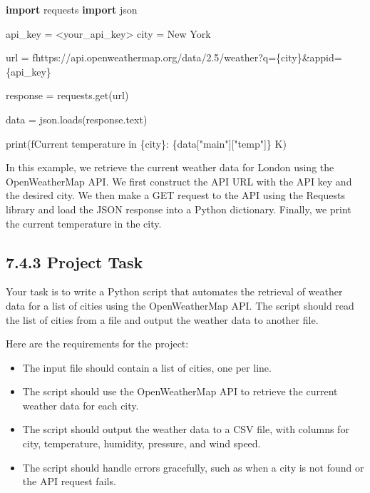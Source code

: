 \documentclass[
  paper=a4,
  ,captions=tableheading
]{scrartcl}
\newenvironment{Shaded}{}{}
\newcommand{\BuiltInTok}[1]{\textcolor[rgb]{0.00,0.50,0.00}{#1}}
\newcommand{\ImportTok}[1]{\textcolor[rgb]{0.00,0.50,0.00}{\textbf{#1}}}
\newcommand{\NormalTok}[1]{#1}
\newcommand{\OperatorTok}[1]{\textcolor[rgb]{0.40,0.40,0.40}{#1}}
\newcommand{\SpecialCharTok}[1]{\textcolor[rgb]{0.25,0.44,0.63}{#1}}
\newcommand{\SpecialStringTok}[1]{\textcolor[rgb]{0.73,0.40,0.53}{#1}}
\newcommand{\StringTok}[1]{\textcolor[rgb]{0.25,0.44,0.63}{#1}}
\providecommand{\tightlist}{%
  \setlength{\itemsep}{0pt}\setlength{\parskip}{0pt}}
\begin{document}
\begin{Shaded}
\begin{Highlighting}[]
\ImportTok{import}\NormalTok{ requests}
\ImportTok{import}\NormalTok{ json}

\NormalTok{api\_key }\OperatorTok{=} \StringTok{\textquotesingle{}\textless{}your\_api\_key\textgreater{}\textquotesingle{}}
\NormalTok{city }\OperatorTok{=} \StringTok{\textquotesingle{}New York\textquotesingle{}}

\NormalTok{url }\OperatorTok{=} \SpecialStringTok{f\textquotesingle{}https://api.openweathermap.org/data/2.5/weather?q=}\SpecialCharTok{\{}\NormalTok{city}\SpecialCharTok{\}}\SpecialStringTok{\&appid=}\SpecialCharTok{\{}\NormalTok{api\_key}\SpecialCharTok{\}}\SpecialStringTok{\textquotesingle{}}

\NormalTok{response }\OperatorTok{=}\NormalTok{ requests.get(url)}

\NormalTok{data }\OperatorTok{=}\NormalTok{ json.loads(response.text)}

\BuiltInTok{print}\NormalTok{(}\SpecialStringTok{f\textquotesingle{}Current temperature in }\SpecialCharTok{\{}\NormalTok{city}\SpecialCharTok{\}}\SpecialStringTok{: }\SpecialCharTok{\{}\NormalTok{data[}\StringTok{"main"}\NormalTok{][}\StringTok{"temp"}\NormalTok{]}\SpecialCharTok{\}}\SpecialStringTok{ K\textquotesingle{}}\NormalTok{)}
\end{Highlighting}
\end{Shaded}

In this example, we retrieve the current weather data for London using
the OpenWeatherMap API. We first construct the API URL with the API key
and the desired city. We then make a GET request to the API using the
Requests library and load the JSON response into a Python dictionary.
Finally, we print the current temperature in the city.

\hypertarget{project-task}{%
\subsection{7.4.3 Project Task}\label{project-task}}

Your task is to write a Python script that automates the retrieval of
weather data for a list of cities using the OpenWeatherMap API. The
script should read the list of cities from a file and output the weather
data to another file.

Here are the requirements for the project:

\begin{itemize}
\tightlist
\item
  The input file should contain a list of cities, one per line.
\item
  The script should use the OpenWeatherMap API to retrieve the current
  weather data for each city.
\item
  The script should output the weather data to a CSV file, with columns
  for city, temperature, humidity, pressure, and wind speed.
\item
  The script should handle errors gracefully, such as when a city is not
  found or the API request fails.
\end{itemize}
\end{document}
